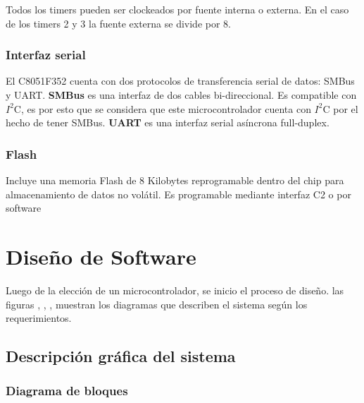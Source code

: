 \documentclass{article}
\theoremstyle{definition}
\theoremstyle{remark}
\begin{document}
Todos los timers pueden ser clockeados por fuente interna o externa. En el caso de los timers 2 y 3 la fuente externa se divide por 8.


\subsubsection{Interfaz serial} %
\label{ssub:interfaz_serial}

El C8051F352 cuenta con dos protocolos de transferencia serial de datos: SMBus y UART. \textbf{SMBus} es una interfaz de dos cables bi-direccional. Es compatible con $I^{2}$C, es por esto que se considera que este microcontrolador cuenta con $I^{2}$C por el hecho de tener SMBus. \textbf{UART} es una interfaz serial asíncrona full-duplex.


\subsubsection{Flash} %
\label{ssub:flash}

Incluye una memoria Flash de 8 Kilobytes reprogramable dentro del chip para almacenamiento de datos no volátil. Es programable mediante interfaz C2 o por software



\section{Diseño de Software} %
\label{sec:dise~no_de_software}


Luego de la elección de un microcontrolador, se inicio el proceso de diseño. las figuras , , , muestran los diagramas que describen el sistema según los requerimientos.

\subsection{Descripción gráfica del sistema} %
\label{sub:descripcion_grafica_del_sistema}

\subsubsection{Diagrama de bloques} %
\label{ssub:diagrama_de_bloques}
\end{document}
